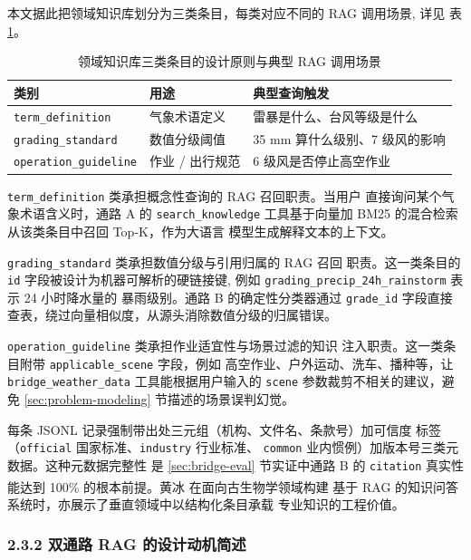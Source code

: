 \documentclass[a4paper]{article}
\newcommand{\song}{\CJKfamily{song}}
\theoremstyle{definition}
\theoremstyle{plain}
\theoremstyle{remark}
\newcommand{\reftab}[1]{表 \ref{#1}}
\let\oldcite\cite
\renewcommand{\cite}[1]{\textsuperscript{\oldcite{#1}}}
\newcommand{\bk}{\discretionary{}{}{}}
\begin{document}
本文据此把领域知识库划分为三类条目，每类对应不同的 RAG 调用场景,
详见 \reftab{tab:kb-three-categories}。

\begin{table}[!ht]
    \centering
    \caption{领域知识库三类条目的设计原则与典型 RAG 调用场景}
    \label{tab:kb-three-categories}
    \song\fontsize{9pt}{12pt}\selectfont
    \renewcommand{\arraystretch}{0.95}
    \begin{tabular}{lll}
        \toprule
        类别 & 用途 & 典型查询触发 \\
        \midrule
        \texttt{term\_\bk{}definition} & 气象术语定义 & 雷暴是什么、台风等级是什么 \\
        \texttt{grading\_\bk{}standard} & 数值分级阈值 & 35 mm 算什么级别、7 级风的影响 \\
        \texttt{operation\_\bk{}guideline} & 作业 / 出行规范 & 6 级风是否停止高空作业 \\
        \bottomrule
    \end{tabular}
\end{table}

\texttt{term\_\bk{}definition} 类承担概念性查询的 RAG 召回职责。当用户
直接询问某个气象术语含义时，通路 A 的 \texttt{search\_\bk{}knowledge}
工具基于向量加 BM25 的混合检索从该类条目中召回 Top-K，作为大语言
模型生成解释文本的上下文。

\texttt{grading\_\bk{}standard} 类承担数值分级与引用归属的 RAG 召回
职责。这一类条目的 \texttt{id} 字段被设计为机器可解析的硬链接键,
例如 \texttt{grading\_\bk{}precip\_\bk{}24h\_\bk{}rainstorm} 表示 24 小时降水量的
暴雨级别。通路 B 的确定性分类器通过 \texttt{grade\_\bk{}id} 字段直接
查表，绕过向量相似度，从源头消除数值分级的归属错误。

\texttt{operation\_\bk{}guideline} 类承担作业适宜性与场景过滤的知识
注入职责。这一类条目附带 \texttt{applicable\_\bk{}scene} 字段，例如
高空作业、户外运动、洗车、播种等，让 \texttt{bridge\_\bk{}weather\_\bk{}data}
工具能根据用户输入的 \texttt{scene} 参数裁剪不相关的建议，避免
\ref{sec:problem-modeling} 节描述的场景误判幻觉。

每条 JSONL 记录强制带出处三元组（机构、文件名、条款号）加可信度
标签（\texttt{official} 国家标准、\texttt{industry} 行业标准、
\texttt{common} 业内惯例）加版本号三类元数据。这种元数据完整性
是 \ref{sec:bridge-eval} 节实证中通路 B 的 \texttt{citation} 真实性
能达到 100\% 的根本前提。黄冰 \cite{ref4} 在面向古生物学领域构建
基于 RAG 的知识问答系统时，亦展示了垂直领域中以结构化条目承载
专业知识的工程价值。

\subsubsection*{2.3.2 \quad 双通路 RAG 的设计动机简述}
\end{document}
